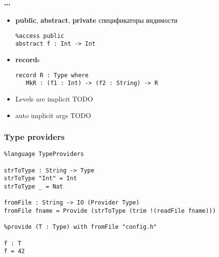 \begin{frame}[fragile]
   \frametitle{\dots}
   \begin{itemize}
   \item \textbf{public}, \textbf{abstract}, \textbf{private} спецификаторы видимости
      \begin{lstlisting}
%access public
abstract f : Int -> Int
      \end{lstlisting}
   \item \textbf{record}s
      \begin{lstlisting}
record R : Type where
   MkR : (f1 : Int) -> (f2 : String) -> R
      \end{lstlisting}
   \item Levels are implicit
      TODO
   \item auto implicit args
      TODO
   \end{itemize}
\end{frame}

\begin{frame}[fragile]
   \frametitle{Type providers} %
   \begin{lstlisting}
%language TypeProviders

strToType : String -> Type
strToType "Int" = Int
strToType _ = Nat

fromFile : String -> IO (Provider Type)
fromFile fname = Provide (strToType (trim !(readFile fname)))

%provide (T : Type) with fromFile "config.h"

f : T
f = 42
   \end{lstlisting}
\end{frame}


